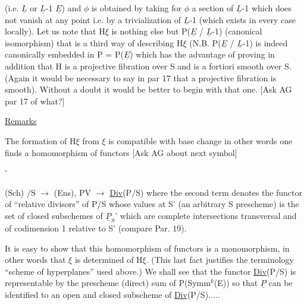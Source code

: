 
(i.e. $\underline{L}$ or $\underline{L}$-1 \hand{\unsure{$\subset$|$\in$}} $\underline{E}$) and $\phi$ is obtained by taking for $\phi$ a
section of $\underline{L}$-1 which does not vanish at any point i.e. by a
trivialization of $\underline{L}$-1 (which exists in every case locally). Let us
note that H$\xi$ is nothing else but P($\underline{E}$ / $\underline{L}$-1) (canonical isomorphism)
that is a third way of describing H$\xi$ (N.B. P($\underline{E}$ / $\underline{L}$-1) is indeed
canonically embedded in P = P($\underline{E}$) which has the advantage of
proving in addition that H is a projective fibration over S and is
a fortiori smooth over S. (Again it would be necessary to say in
par 17 that a projective fibration is smooth). Without a doubt it
would be better to begin with that one. [Ask AG par 17 of what?]

\uline{Remarks}

The formation of H$\xi$ from $\xi$ is compatible with base change in
other words one finds a homomorphism of functors [Ask AG about
next symbol]

\quad $^{\circ}$

(Sch) /S $\rightarrow$ (Ens), PV $\rightarrow$ \uline{Div}(P/S) where the second term denotes the
functor of ``relative divisors'' of P/S whose values at S' (an
arbitrary S prescheme) is the set of closed subschemes of $\underline{P}_{S}$' which
are complete intersections transversal and of codimension 1
relative to S' (compare Par. 19).

It is easy to show that this homomorphism of functors is a
monomorphism, in other words that $\xi$ is determined of H$\xi$. (This
last fact justifies the terminology ``scheme of hyperplanes'' used
above.) We shall see that the functor \uline{Div}(P/S) is representable
by the prescheme (direct) sum of P(Symm$^{k}$(E)) so that $\underline{P}$ can be
identified to an open and closed subscheme of \uline{Div}(P/S).....
